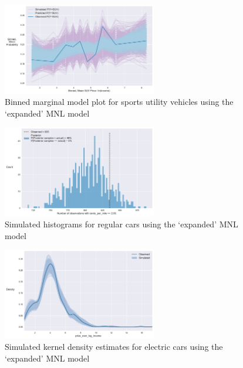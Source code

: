 \documentclass[preprint]{elsarticle}
\begin{document}
\begin{figure}
\centering
\includegraphics[width=0.6\textwidth]{marginal-model-plot-vehicle-choice-interaction-mnl-suv}
\caption{Binned marginal model plot for sports utility vehicles using the `expanded' MNL model}
\label{fig:new-mnl-suv-marginal}
\end{figure}

\begin{figure}
\centering
\includegraphics[width=0.6\textwidth]{histogram-vehicle-choice-interaction-mnl-regcar-operating-costs}
\caption{Simulated histograms for regular cars using the `expanded' MNL model}
\label{fig:new-mnl-regcar-histogram}
\end{figure}

\begin{figure}
\centering
\includegraphics[width=0.6\textwidth]{kde-vehicle-choice-interaction-mnl-electric-price}
\caption{Simulated kernel density estimates for electric cars using the `expanded' MNL model}
\label{fig:new-mnl-electric-kde}
\end{figure}
\end{document}
